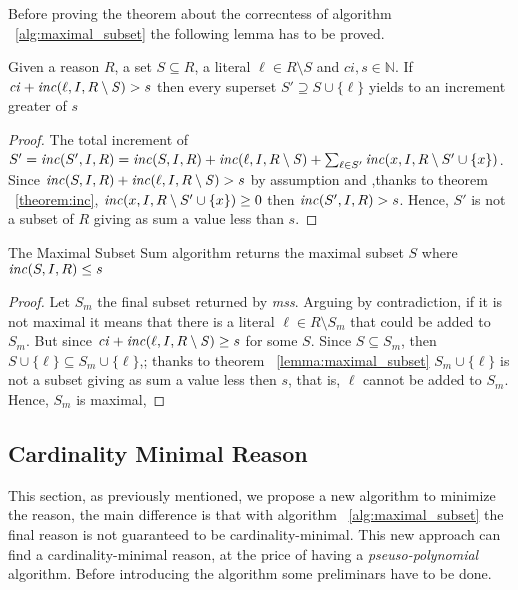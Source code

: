 Before proving the theorem about the correcntess of algorithm ~\ref{alg:maximal_subset}
the following lemma has to be proved.

\begin{lemma}
    \label{lemma:maximal_subset}
    Given a reason $R$, a set $S \subseteq R$, a literal $\ell \in R \setminus S$
    and $\mathit{ci},s \in \mathbb{N}$.
    If $\mathit{ci} +  \mathit{inc}(\ell,I,R \setminus \mathit{S}) > s$
    then every superset  $S' \supseteq S \cup \{\ell\}$ yields to 
    an increment greater of $s$
\end{lemma}

\begin{proof}
    The total increment of $S' = \mathit{inc}(S',I,R) = \mathit{inc}(S,I,R) + \mathit{inc}(\ell,I,R \setminus \mathit{S}) + 
    \sum_{\ell \in S'} \mathit{inc}(x, I, R \setminus S' \cup \{x\})$.
    Since $\mathit{inc}(S,I,R) + \mathit{inc}(\ell,I,R \setminus \mathit{S}) > s$ by assumption and 
    ,thanks to theorem ~\ref{theorem:inc}, $\mathit{inc}(x, I, R \setminus S' \cup \{x\}) \ge 0$ then 
    $\mathit{inc}(S',I,R) > s$.
    Hence, $S'$ is not a subset of $R$ giving as sum a value less than $s$.

\end{proof}

\begin{theorem}
    The Maximal Subset Sum algorithm returns the maximal subset $S$ where $\mathit{inc}(S,I,R) \le s$
\end{theorem}

\begin{proof}
    Let $S_m$ the final subset returned by \textit{mss}.
    Arguing by contradiction, if it is not maximal 
    it means that there is a literal $\ell \in R \setminus S_m$ that could be
    added to $S_m$.
    But since $\mathit{ci} +  \mathit{inc}(\ell,I,R \setminus \mathit{S}) \ge s$
    for some $S$.
    Since $S \subseteq S_m$, then $S \cup \{\ell\} \subseteq S_m \cup \{\ell\}$,;
    thanks to theorem ~\ref{lemma:maximal_subset} $S_m \cup \{\ell\}$
    is not a subset giving as sum a value less then $s$, that is, $\ell$ cannot be 
    added to $S_m$.
    Hence, $S_m$ is maximal,
\end{proof}


\subsection{Cardinality Minimal Reason}
\label{subsec:cardinality_minimal_reason}

This section, as previously mentioned, we propose a new algorithm to minimize the reason,
the main difference is that with algorithm ~\ref{alg:maximal_subset} the final reason 
is not guaranteed to be cardinality-minimal.
This new approach can find a cardinality-minimal reason, at the price of 
having a \textit{pseuso-polynomial} algorithm.
Before introducing the algorithm some preliminars have to be done.

